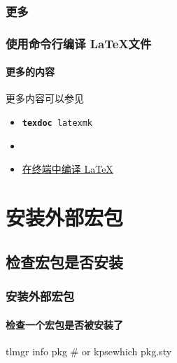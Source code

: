 \subsubsection{更多}

\begin{frame}
  \frametitle{使用命令行编译 \LaTeX 文件}
  \framesubtitle{更多的内容}
  更多内容可以参见
  \begin{itemize}
    \item \texttt{\textbf{texdoc} latexmk}
    \item {}
    \item \href{https://syvshc.github.io/2022-03-06-latex-terminal-compiling/}{在终端中编译 \LaTeX}
  \end{itemize}
\end{frame}

\section{安装外部宏包}
\subsection{检查宏包是否安装}

\begin{frame}[fragile]
  \frametitle{安装外部宏包}
  \framesubtitle{检查一个宏包是否被安装了}
\begin{cmdcode}
tlmgr info pkg
# or 
kpsewhich pkg.sty
\end{cmdcode}
\end{frame}

